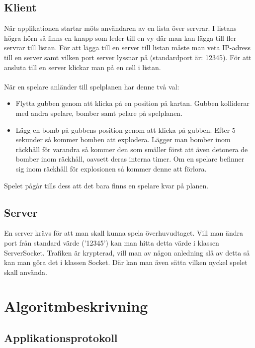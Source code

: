 \documentclass[10pt, titlepage, oneside, a4paper]{article}
\begin{document}
    	\subsection{Klient}
    		När applikationen startar möts användaren av en lista över servrar. I listans högra hörn så finns en knapp som leder till en vy där man kan lägga till fler servrar till listan. För att lägga till en server till listan måste man veta IP-adress till en server samt vilken port server lyssnar på (standardport är: 12345). För att ansluta till en server klickar man på en cell i listan.\\\\När en spelare anländer till spelplanen har denne två val:
    		\begin{itemize}
    			\item Flytta gubben genom att klicka på en position på kartan. Gubben kolliderar med andra spelare, bomber samt pelare på spelplanen.
    			\item Lägg en bomb på gubbens position genom att klicka på gubben. Efter 5 sekunder så kommer bomben att explodera. Lägger man bomber inom räckhåll för varandra så kommer den som smäller först att även detonera de bomber inom räckhåll, oavsett deras interna timer. Om en spelare befinner sig inom räckhåll för explosionen så kommer denne att förlora.
    		\end{itemize}
    		
    		Spelet pågår tills dess att det bara finns en spelare kvar på planen.
    		
    	\subsection{Server}
    		En server krävs för att man skall kunna spela överhuvudtaget. Vill man ändra port från standard värde ('12345') kan man hitta detta värde i klassen ServerSocket. Trafiken är krypterad, vill man av någon anledning slå av detta så kan man göra det i klassen Socket. Där kan man även sätta vilken nyckel spelet skall använda.
    		
    	\newpage
    	
    \section{Algoritmbeskrivning}
    	\subsection{Applikationsprotokoll}
\end{document}
